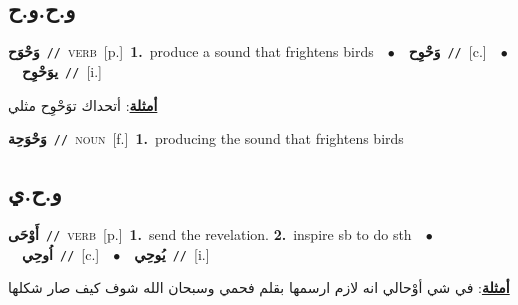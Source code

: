 \documentclass[10pt,a4paper,twoside]{article} %
\begin{document}
\begin{multicols}{2}
\vspace{-3mm}
\subsection*{\color{blue}\foreignlanguage{arabic}{و.ح.و.ح}\color{blue}{}} 

{\setlength\topsep{0pt}\textbf{\foreignlanguage{arabic}{وَحْوَح}}\ {\color{gray}\texttt{//}\color{black}}\ \textsc{verb}\ [p.]\ \textbf{1.}~produce a sound that frightens birds\ \ $\bullet$\ \ \setlength\topsep{0pt}\textbf{\foreignlanguage{arabic}{وَحْوِح}}\ {\color{gray}\texttt{//}\color{black}}\ [c.]\ \ $\bullet$\ \ \setlength\topsep{0pt}\textbf{\foreignlanguage{arabic}{يوَحْوِح}}\ {\color{gray}\texttt{//}\color{black}}\ [i.]\  \begin{flushright}\color{gray}\foreignlanguage{arabic}{\textbf{\underline{\foreignlanguage{arabic}{أمثلة}}}: أتحداك توَحْوِح مثلي}\end{flushright}\color{black}} \vspace{2mm}

{\setlength\topsep{0pt}\textbf{\foreignlanguage{arabic}{وَحْوَحِة}}\ {\color{gray}\texttt{//}\color{black}}\ \textsc{noun}\ [f.]\ \textbf{1.}~producing the sound that frightens birds\ } \vspace{2mm}

\vspace{-3mm}
\subsection*{\color{blue}\foreignlanguage{arabic}{و.ح.ي}\color{blue}{}} 

{\setlength\topsep{0pt}\textbf{\foreignlanguage{arabic}{أَوْحَى}}\ {\color{gray}\texttt{//}\color{black}}\ \textsc{verb}\ [p.]\ \textbf{1.}~send the revelation.  \textbf{2.}~inspire sb to do sth\ \ $\bullet$\ \ \setlength\topsep{0pt}\textbf{\foreignlanguage{arabic}{اُوحِي}}\ {\color{gray}\texttt{//}\color{black}}\ [c.]\ \ $\bullet$\ \ \setlength\topsep{0pt}\textbf{\foreignlanguage{arabic}{يُوحِي}}\ {\color{gray}\texttt{//}\color{black}}\ [i.]\  \begin{flushright}\color{gray}\foreignlanguage{arabic}{\textbf{\underline{\foreignlanguage{arabic}{أمثلة}}}: في شي أوْحالي انه لازم ارسمها بقلم فحمي وسبحان الله شوف كيف صار شكلها}\end{flushright}\color{black}} \vspace{2mm}


\end{multicols}
\end{document}
